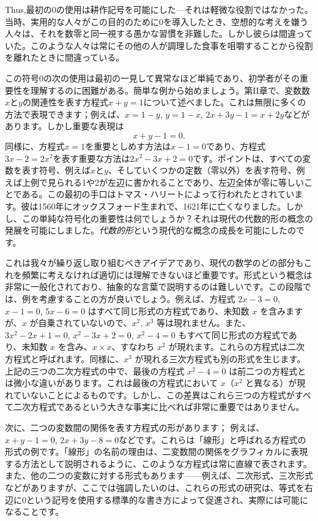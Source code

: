 \documentclass[a4paper,11pt,openany]{ltjsbook}
\begin{document}
Thus,最初の0の使用は耕作記号を可能にした---それは軽微な役割ではなかった。当時、実用的な人々がこの目的のために0を導入したとき、空想的な考えを嫌う人々は、それを数零と同一視する愚かな習慣を非難した。しかし彼らは間違っていた。このような人々は常にその他の人が調理した食事を咀嚼することから役割を離れたときに間違っている。

この符号0の次の使用は最初の一見して異常なほど単純であり、初学者がその重要性を理解するのに困難がある。簡単な例から始めましょう。第II章で、変数数$x$と$y$の関連性を表す方程式$x + y = 1$について述べました。これは無限に多くの方法で表現できます；例えば、$x = 1 - y$, $y = 1 - x$, $2x + 3y - 1 = x + 2y$などがあります。しかし重要な表現は
\[
x + y - 1 = 0.
\]
同様に、方程式$x = 1$を重要としめす方法は$x - 1 = 0$であり、方程式$3x - 2 = 2x^{2}$を表す重要な方法は$2x^{2} - 3x + 2 = 0$です。ポイントは、すべての変数を表す符号、例えば$x$と$y$、そしていくつかの定数（零以外）を表す符号、例えば上例で見られる1や2が左辺に書かれることであり、左辺全体が零に等しいことである。この最初の手口はトマス・ハリートによって行われたとされています。彼は1560年にオックスフォード生まれで、1621年に亡くなりました。しかし、この単純な符号化の重要性は何でしょうか？それは現代の代数的形の概念の発展を可能にしました。\emph{代数的形}という現代的な概念の成長を可能にしたのです。

これは我々が繰り返し取り組むべきアイデアであり、現代の数学のどの部分もこれを頻繁に考えなければ適切には理解できないほど重要です。形式という概念は非常に一般化されており、抽象的な言葉で説明するのは難しいです。この段階では、例を考慮することの方が良いでしょう。例えば、方程式 $2x - 3 = 0$, $x - 1 = 0$, $5x - 6 = 0$ はすべて同じ形式の方程式であり、未知数 $x$ を含みますが、$x$ が自乗されていないので、$x^{2}$, $x^{3}$ 等は現れません。また、$3x^{2} - 2x + 1 = 0$, $x^{2} - 3x + 2 = 0$, $x^{2} - 4 = 0$ もすべて同じ形式の方程式であり、未知数 $x$ を含み、$x \times x$、すなわち $x^{2}$ が現れます。これらの方程式は二次方程式と呼ばれます。同様に、$x^{3}$ が現れる三次方程式も別の形式を生じます。上記の三つの二次方程式の中で、最後の方程式 $x^{2} - 4 = 0$ は前二つの方程式とは微小な違いがあります。これは最後の方程式において $x$（$x^{2}$ と異なる）が現れていないことによるものです。しかし、この差異はこれら三つの方程式がすべて二次方程式であるという大きな事実に比べれば非常に重要ではありません。

次に、二つの変数間の関係を表す方程式の形があります；
例えば、$x + y - 1 = 0$, $2x + 3y - 8 = 0$などです。これらは「線形」と呼ばれる方程式の形式の例です。「線形」の名前の理由は、二変数間の関係をグラフィカルに表現する方法として説明されるように、このような方程式は常に直線で表されます。また、他の二つの変数に対する形式もあります——例えば、二次形式、三次形式などがありますが、ここでは強調したいのは、これらの形式の研究は、等式を右辺に$0$という記号を使用する標準的な書き方によって促進され、実際には可能になることです。
\end{document}
